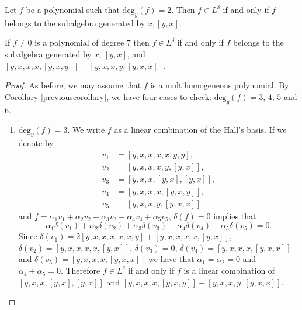 \documentclass[10pt,a4paper]{amsart}
\begin{document}
\begin{corollary}\label{previouscorollary}
Let $f$ be a polynomial such that $\mbox{deg}_y(f) = 2$. Then $f\in L^{\delta}$ if and only if $f $ belongs to the subalgebra generated by $x, [y, x]$.
\end{corollary}

\begin{proposition}If $f \ne 0$ is a polynomial of degree $7$  then $f \in L^\delta$ if and only if $f $ belongs to the subalgebra generated by $x$, $[y, x]$, and $[y, x, x, x, [y, x, y]] - [y, x, x, y, [y, x, x]]$.
\end{proposition}

\begin{proof} As before, we may assume that $f$ is a multihomogeneous
polynomial. By Corollary \ref{previouscorollary}, we have four cases to check: $\mbox{deg}_y(f) = 3$, $4$, $5$ and $6$. 
\begin{enumerate}
\item $\mbox{deg}_y(f) = 3$. We write $f$ as a linear combination of the Hall's basis.  If we denote by 
\begin{align*}
v_1 &= [y, x, x, x, x, y, y],\\
v_2 &= [y, x, x, x, y, [y, x]],\\
v_3 &= [y, x, x, [y,x], [y, x]],\\
v_4 &= [y, x, x, x, [y, x, y]],\\
v_5 &= [y, x, x, y, [y, x, x]]
\end{align*}
and $f = \alpha_1 v_1 + \alpha_2 v_2  + \alpha_3 v_3 + \alpha_4 v_4 + \alpha_5 v_5$, $\delta(f) = 0$ implies that 
$$\alpha_1 \delta(v_1) + \alpha_2 \delta (v_2)  + \alpha_3 \delta (v_3) + \alpha_4 \delta (v_4)+ \alpha_5 \delta (v_5) = 0.$$ 
Since $\delta(v_1)  = 2[y, x, x, x, x, x, y ]  +  [y, x, x, x, x, [y, x]]$, $\delta(v_2) = [y, x, x, x, x, [y, x]]$, $\delta(v_3) = 0$, $\delta(v_4) = [y, x, x, x, [y, x, x]]$ and $\delta(v_5) = [y, x, x, x, [y, x, x]]$ we have that $\alpha_1 = \alpha_2 = 0$ and $\alpha_4 + \alpha_5 = 0$. Therefore $f \in  L ^\delta$ if and only if $f$ is a linear combination of $[y, x, x, [y, x],[y, x]]$ and $[y, x, x, x, [y, x, y]] - [y, x, x, y, [y, x, x]]$.
 

\end{enumerate}
\end{proof}
\end{document}

